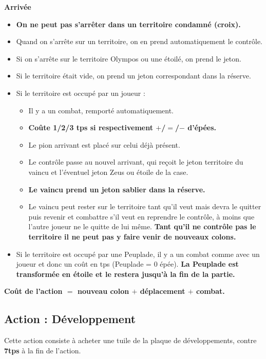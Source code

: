 \documentclass[10pt, a4paper]{article}	%
\begin{document}
\begin{multicols}{3}
\vspace{0.1cm}
\textbf{Arrivée}
\begin{itemize}
\item \textbf{On ne peut pas s'arrêter dans un territoire condamné (croix).}
\item Quand on s'arrête sur un territoire, on en prend automatiquement le contrôle.
\item Si on s'arrête sur le territoire Olympos ou une étoilé, on prend le jeton.
\item Si le territoire était vide, on prend un jeton correspondant dans la réserve.
\item Si le territoire est occupé par un joueur :
	\begin{itemize}
	\item Il y a un combat, remporté automatiquement.
	\item \textbf{Coûte 1/2/3 tps si respectivement $+$/$=$/$-$ d'épées.}
	\item Le pion arrivant est placé sur celui déjà présent.
	\item Le contrôle passe au nouvel arrivant, qui reçoit le jeton territoire du \og vaincu\fg{} et l'éventuel jeton Zeus ou étoile de la case.
	\item \textbf{Le vaincu prend un jeton sablier dans la réserve.}
	\item Le vaincu peut rester sur le territoire tant qu'il veut mais devra le quitter puis revenir et combattre s'il veut en reprendre le contrôle, à moins que l'autre joueur ne le quitte de lui même.\textbf{ Tant qu'il ne contrôle pas le territoire il ne peut pas y faire venir de nouveaux colons.}
	\end{itemize}
\item Si le territoire est occupé par une Peuplade, il y a un combat comme avec un joueur et donc un coût en tps (Peuplade = 0 épée).
\textbf{La Peuplade est transformée en étoile et le restera jusqu'à la fin de la partie.}
\end{itemize}

\vspace{0.3cm}
\textbf{Coût de l'action $=$ nouveau colon $+$ déplacement $+$ combat.}



\subsection{Action : Développement}
Cette action consiste à acheter une tuile de la plaque de développements, contre \textbf{7tps} à la fin de l'action.


\end{multicols}
\end{document}
